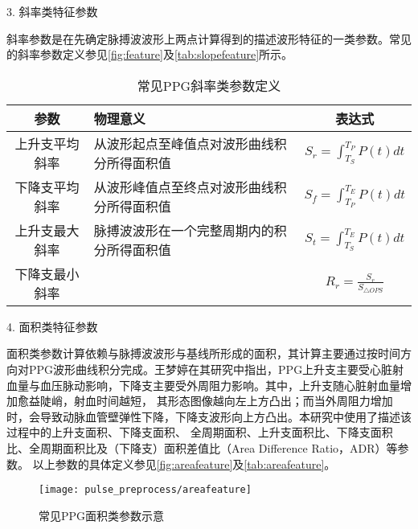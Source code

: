 3. 斜率类特征参数

斜率参数是在先确定脉搏波波形上两点计算得到的描述波形特征的一类参数。常见的斜率参数定义参见\autoref{fig:feature}及\autoref{tab:slopefeature}所示。
\begin{table}[htbp]
    \centering
    \caption{\label{tab:slopefeature}常见PPG斜率类参数定义}
    \begin{tabularx}{\linewidth}{cX<{\centering}c}
    \toprule
    \textbf{参数} & \textbf{物理意义} & \textbf{表达式} \\
    \midrule
    上升支平均斜率      &  从波形起点至峰值点对波形曲线积分所得面积值         &  $S_r=\int_{T_S}^{T_P}P(t)dt$\\
    下降支平均斜率      &  从波形峰值点至终点对波形曲线积分所得面积值         &  $S_f=\int_{T_P}^{T_E}P(t)dt$\\
    上升支最大斜率      &  脉搏波波形在一个完整周期内的积分所得面积值         &  $S_t=\int_{T_S}^{T_E}P(t)dt$\\
    下降支最小斜率    &           &   $R_r=\frac{S_r}{S_{\triangle OPS}}$    \\
    \bottomrule
    \end{tabularx}
\end{table}

4. 面积类特征参数

面积类参数计算依赖与脉搏波波形与基线所形成的面积，其计算主要通过按时间方向对PPG波形曲线积分完成。王梦婷在其研究中指出\cite{mmt}，PPG上升支主要受心脏射血量与血压脉动影响，下降支主要受外周阻力影响。其中，上升支随心脏射血量增加愈益陡峭，射血时间越短，
其形态图像越向左上方凸出；而当外周阻力增加时，会导致动脉血管壁弹性下降，下降支波形向上方凸出。本研究中使用了描述该过程中的上升支面积、下降支面积、
全周期面积、上升支面积比、下降支面积比、全周期面积比及（下降支）面积差值比（Area Difference Ratio，ADR）\cite{Feng2018}等参数。
以上参数的具体定义参见\autoref{fig:areafeature}及\autoref{tab:areafeature}。
\begin{figure}[htbp]
    \centering
    \texttt{[image: pulse\_preprocess/areafeature]}
    \caption{\label{fig:areafeature}常见PPG面积类参数示意}
\end{figure}


